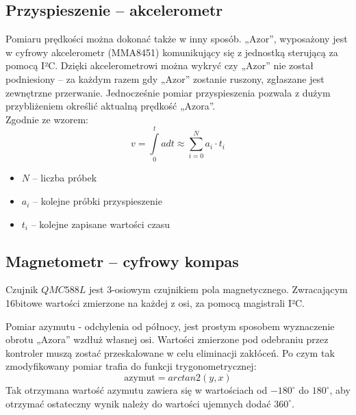     \subsection{Przyspieszenie -- akcelerometr}
        \tab Pomiaru prędkości można dokonać także w inny sposób.
        „Azor”, wyposażony jest w cyfrowy akcelerometr (MMA8451) komunikujący się z jednostką sterującą za pomocą I²C.
        Dzięki akcelerometrowi można wykryć czy „Azor” nie został podniesiony -- za każdym razem gdy „Azor” zostanie ruszony, zgłaszane jest zewnętrzne przerwanie. 
        Jednocześnie pomiar przyspieszenia pozwala z dużym przybliżeniem określić aktualną prędkość „Azora”.\\
        Zgodnie ze wzorem:
        \begin{equation*}
            v = \int\limits_{0}^{t} a dt \approx \sum_{i = 0}^{N} a_i \cdot t_i
        \end{equation*}
        \begin{itemize}
            \item $N$ -- liczba próbek
            \item $a_i$ -- kolejne próbki przyspieszenie
            \item $t_i$ -- kolejne zapisane wartości czasu
        \end{itemize}

    \subsection{Magnetometr -- cyfrowy kompas}
        \tab Czujnik $QMC588L$ jest 3-osiowym czujnikiem pola magnetycznego. Zwracającym 16bitowe wartości zmierzone na każdej z osi, za pomocą magistrali I²C.
        
        Pomiar azymutu - odchylenia od północy, jest prostym sposobem wyznaczenie obrotu „Azora” wzdłuż własnej osi.
        Wartości zmierzone pod odebraniu przez kontroler muszą zostać przeskalowane w celu eliminacji zakłóceń.
        Po czym tak zmodyfikowany pomiar trafia do  funkcji trygonometrycznej:
        \begin{equation*}
            \text{azymut} = arctan2(y, x)
        \end{equation*}
        Tak otrzymana wartość azymutu zawiera się w wartościach od $-180^\circ$ do $180^\circ$, aby otrzymać ostateczny wynik należy do wartości ujemnych dodać $360^\circ$.
